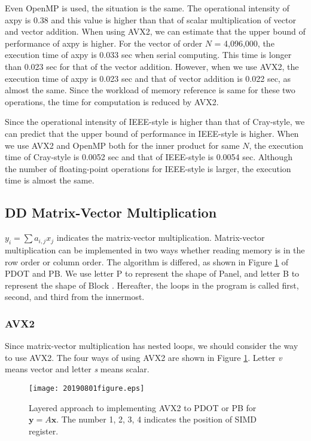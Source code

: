 \documentclass{IOS-Book-Article}
\begin{document}
Even OpenMP is used, the situation is the same. The operational intensity of axpy is 0.38 and this value is higher than that of scalar multiplication of vector and vector addition. When using AVX2, we can estimate that the upper bound of performance of axpy is higher. For the vector of order $N$ = 4,096,000, the execution time of axpy is 0.033 sec when serial computing. This time is longer than 0.023 sec for that of the vector addition. However, when we use AVX2, the execution time of axpy is 0.023 sec and that of vector addition is 0.022 sec, as almost the same. Since the workload of memory reference is same for these two operations, the time for computation is reduced by AVX2.

Since the operational intensity of IEEE-style is higher than that of Cray-style, we can predict that the upper bound of performance in IEEE-style is higher. When we use AVX2 and OpenMP both for the inner product for same $N$, the execution time of Cray-style is 0.0052 sec and that of IEEE-style is 0.0054 sec. Although the number of floating-point operations for IEEE-style is larger, the execution time is almost the same.

\subsection{DD Matrix-Vector Multiplication}
$y_{i} = \sum a_{i,j}x_{j}$ indicates the matrix-vector multiplication. 
Matrix-vector multiplication can be implemented in two ways whether reading memory is in the row order or column order. The algorithm is differed, as shown in Figure \ref{figimpAVX} of PDOT and PB. We use letter P to represent the shape of Panel, and letter B to represent the shape of Block \cite{goto}. Hereafter, the loops in the program is called first, second, and third from the innermost.
\subsubsection{AVX2}
Since matrix-vector multiplication has nested loops, we should consider the way to use AVX2. The four ways of using AVX2 are shown in Figure \ref{figimpAVX}. Letter {\it v} means vector and letter {\it s} means scalar. 

\begin{figure}[htbp]
  \begin{center}
    \texttt{[image: 20190801figure.eps]}
    \caption{Layered approach to implementing AVX2 to PDOT or PB for $\bm{y} = A\bm{x}$. The number 1, 2, 3, 4 indicates the position of SIMD register. }
    \label{figimpAVX}
  \end{center}
\end{figure}
\end{document}
